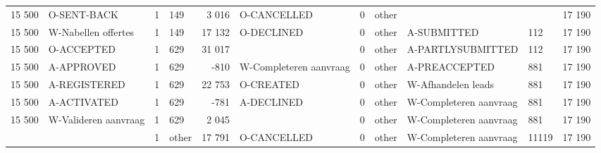 \begin{tabular}{llllrlllllr}
15 500 & O-SENT-BACK & 1 & 149 & 3 016 & O-CANCELLED & 0 & other &  &  & 17 190 \\
15 500 & W-Nabellen offertes & 1 & 149 & 17 132 & O-DECLINED & 0 & other & A-SUBMITTED & 112 & 17 190 \\
15 500 & O-ACCEPTED & 1 & 629 & 31 017 &  & 0 & other & A-PARTLYSUBMITTED & 112 & 17 190 \\
15 500 & A-APPROVED & 1 & 629 & -810 & W-Completeren aanvraag & 0 & other & A-PREACCEPTED & 881 & 17 190 \\
15 500 & A-REGISTERED & 1 & 629 & 22 753 & O-CREATED & 0 & other & W-Afhandelen leads & 881 & 17 190 \\
15 500 & A-ACTIVATED & 1 & 629 & -781 & A-DECLINED & 0 & other & W-Completeren aanvraag & 881 & 17 190 \\
15 500 & W-Valideren aanvraag & 1 & 629 & 2 045 &  & 0 & other & W-Completeren aanvraag & 881 & 17 190 \\
 &  & 1 & other & 17 791 & O-CANCELLED & 0 & other & W-Completeren aanvraag & 11119 & 17 190 \\
\bottomrule
\end{tabular}
